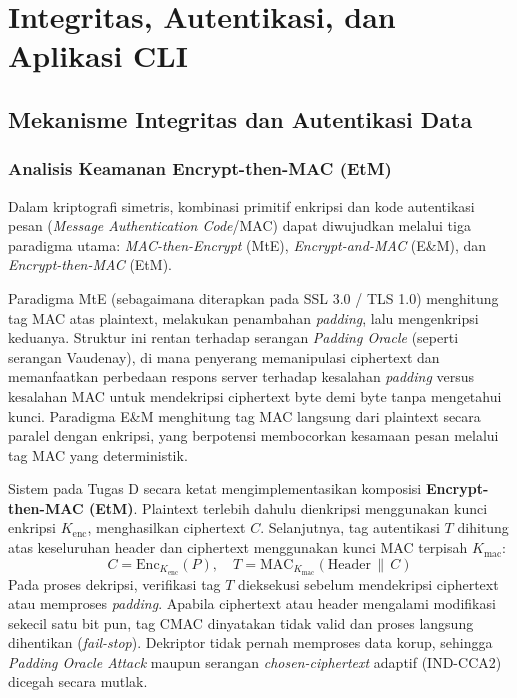 \section{Integritas, Autentikasi, dan Aplikasi CLI}

\subsection{Mekanisme Integritas dan Autentikasi Data}

\subsubsection{Analisis Keamanan Encrypt-then-MAC (EtM)}
Dalam kriptografi simetris, kombinasi primitif enkripsi dan kode autentikasi pesan (\textit{Message Authentication Code}/MAC) dapat diwujudkan melalui tiga paradigma utama: \textit{MAC-then-Encrypt} (MtE), \textit{Encrypt-and-MAC} (E\&M), dan \textit{Encrypt-then-MAC} (EtM).

Paradigma MtE (sebagaimana diterapkan pada SSL 3.0 / TLS 1.0) menghitung tag MAC atas plaintext, melakukan penambahan \textit{padding}, lalu mengenkripsi keduanya. Struktur ini rentan terhadap serangan \textit{Padding Oracle} (seperti serangan Vaudenay), di mana penyerang memanipulasi ciphertext dan memanfaatkan perbedaan respons server terhadap kesalahan \textit{padding} versus kesalahan MAC untuk mendekripsi ciphertext byte demi byte tanpa mengetahui kunci. Paradigma E\&M menghitung tag MAC langsung dari plaintext secara paralel dengan enkripsi, yang berpotensi membocorkan kesamaan pesan melalui tag MAC yang deterministik.

Sistem pada Tugas D secara ketat mengimplementasikan komposisi \textbf{Encrypt-then-MAC (EtM)}. Plaintext terlebih dahulu dienkripsi menggunakan kunci enkripsi $K_{\text{enc}}$, menghasilkan ciphertext $C$. Selanjutnya, tag autentikasi $T$ dihitung atas keseluruhan header dan ciphertext menggunakan kunci MAC terpisah $K_{\text{mac}}$:
\[
C = \text{Enc}_{K_{\text{enc}}}(P), \quad T = \text{MAC}_{K_{\text{mac}}}(\text{Header} \,\|\, C)
\]
Pada proses dekripsi, verifikasi tag $T$ dieksekusi sebelum mendekripsi ciphertext atau memproses \textit{padding}. Apabila ciphertext atau header mengalami modifikasi sekecil satu bit pun, tag CMAC dinyatakan tidak valid dan proses langsung dihentikan (\textit{fail-stop}). Dekriptor tidak pernah memproses data korup, sehingga \textit{Padding Oracle Attack} maupun serangan \textit{chosen-ciphertext} adaptif (IND-CCA2) dicegah secara mutlak.

